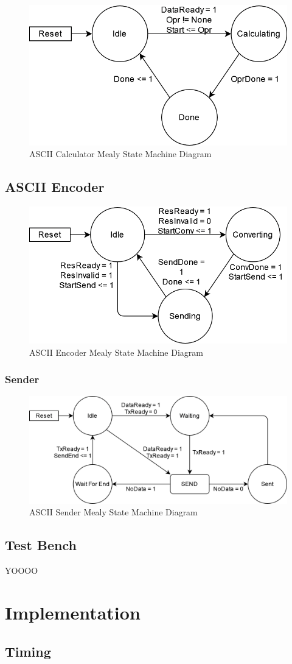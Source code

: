 \documentclass[11pt]{article}
\begin{document}
\begin{figure}[H]        
    \centering
    \includegraphics[width=.66\textwidth]{CalculatorSM.drawio.png}
    \caption{ASCII Calculator Mealy State Machine Diagram}
    \label{fig:calcsm}
\end{figure} 

\subsection{ASCII Encoder}

\begin{figure}[H]        
    \centering
    \includegraphics[width=.66\textwidth]{EncoderSM.drawio.png}
    \caption{ASCII Encoder Mealy State Machine Diagram}
    \label{fig:encodersm}
\end{figure} 

\subsubsection{Sender}
\begin{figure}[H]        
    \centering
    \includegraphics[width=.66\textwidth]{SenderSM.drawio.png}
    \caption{ASCII Sender Mealy State Machine Diagram}
    \label{fig:sendersm}
\end{figure} 


\subsection{Test Bench}
YOOOO


\section{Implementation}
\subsection{Timing}

\pagebreak
\printbibliography
\end{document}
